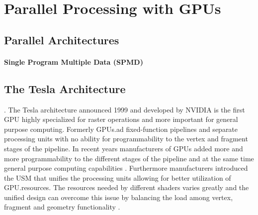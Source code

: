\chapter{Parallel Processing with GPUs}%
\label{cha:parallel_processing_with_gpu} 

\section{Parallel Architectures}
\label{sec:parallel_architectures} 

\subsubsection{Single Program Multiple Data (SPMD)}
\label{ssub:single_program_multiple_data_spmd} 



\section{The Tesla Architecture}.%
\label{sub:the_tesla_architecture} 
The Tesla architecture announced 1999 and developed by NVIDIA is the first
GPU highly specialized for raster operations and more important
for general purpose computing. Formerly \glspl{GPU}.ad fixed-function
pipelines and separate processing units with no ability for programmability to
the vertex and fragment stages of the pipeline. In recent years manufacturers of
GPUs added more and more programmability to the different stages
of the pipeline and at the same time general purpose computing capabilities
\citep{citeulike:3844545}. Furthermore manufacturers introduced the  \gls{USM} 
that unifies the processing units allowing for better
utilization of  \gls{GPU}.resources. The resources needed by different
shaders varies greatly and the unified design can overcome this issue by
balancing the load among vertex, fragment and geometry functionality
\citep{citeulike:3145468}.

